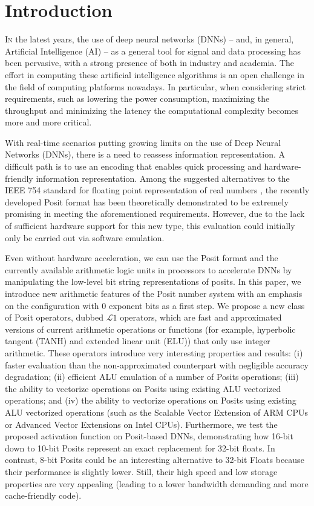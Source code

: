 \chapter{Introduction}
\lettrine{I}{n} the latest years, the use of deep neural networks (DNNs) -- and, in general, Artificial Intelligence (AI) -- as a general tool for signal and data processing has been pervasive, with a strong presence of both in industry and academia. The effort in computing these artificial intelligence algorithms is an open challenge in the field of computing platforms nowadays. In particular, when considering strict requirements, such as lowering the power consumption, maximizing the throughput and minimizing the latency the computational complexity becomes more and more critical.


With real-time scenarios putting growing limits on the use of Deep Neural Networks (DNNs), there is a need to reassess information representation. A difficult path is to use an encoding that enables quick processing and hardware-friendly information representation. Among the suggested alternatives to the IEEE 754 standard for floating point representation of real numbers  \cite{893287}, the recently developed Posit format has been theoretically demonstrated to be extremely promising in meeting the aforementioned requirements. However, due to the lack of sufficient hardware support for this new type, this evaluation could initially only be carried out via software emulation.

Even without hardware acceleration, we can use the Posit format and the currently available arithmetic logic units in processors to accelerate DNNs by manipulating the low-level bit string representations of posits. In this paper, we introduce new arithmetic features of the Posit number system with an emphasis on the configuration with 0 exponent bits as a first step. We propose a new class of Posit operators, dubbed $\mathcal{L}1$ operators, which are fast and approximated versions of current arithmetic operations or functions (for example, hyperbolic tangent (TANH) and extended linear unit (ELU)) that only use integer arithmetic. These operators introduce very interesting properties and results: (i) faster evaluation than the non-approximated counterpart with negligible accuracy degradation; (ii) efficient ALU emulation of a number of Posits operations; (iii) the ability to vectorize operations on Posits using existing ALU vectorized operations; and (iv) the ability to vectorize operations on Posits using existing ALU vectorized operations (such as the Scalable Vector Extension of ARM CPUs or Advanced Vector Extensions on Intel CPUs). Furthermore, we test the proposed activation function on Posit-based DNNs, demonstrating how 16-bit down to 10-bit Posits represent an exact replacement for 32-bit floats. In contrast, 8-bit Posits could be an interesting alternative to 32-bit Floats because their performance is slightly lower. Still, their high speed and low storage properties are very appealing (leading to a lower bandwidth demanding and more cache-friendly code).

